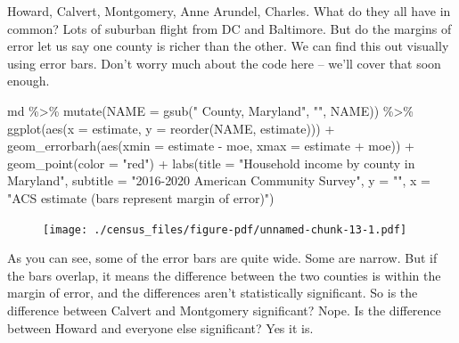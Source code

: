\documentclass[
  letterpaper,
  DIV=11,
  numbers=noendperiod]{scrreprt}
\newenvironment{Shaded}{\begin{snugshade}}{\end{snugshade}}
\newcommand{\AttributeTok}[1]{\textcolor[rgb]{0.40,0.45,0.13}{#1}}
\newcommand{\FunctionTok}[1]{\textcolor[rgb]{0.28,0.35,0.67}{#1}}
\newcommand{\NormalTok}[1]{\textcolor[rgb]{0.00,0.23,0.31}{#1}}
\newcommand{\SpecialCharTok}[1]{\textcolor[rgb]{0.37,0.37,0.37}{#1}}
\newcommand{\StringTok}[1]{\textcolor[rgb]{0.13,0.47,0.30}{#1}}
\begin{document}
Howard, Calvert, Montgomery, Anne Arundel, Charles. What do they all
have in common? Lots of suburban flight from DC and Baltimore. But do
the margins of error let us say one county is richer than the other. We
can find this out visually using error bars. Don't worry much about the
code here -- we'll cover that soon enough.

\begin{Shaded}
\begin{Highlighting}[]
\NormalTok{md }\SpecialCharTok{\%\textgreater{}\%}
  \FunctionTok{mutate}\NormalTok{(}\AttributeTok{NAME =} \FunctionTok{gsub}\NormalTok{(}\StringTok{" County, Maryland"}\NormalTok{, }\StringTok{""}\NormalTok{, NAME)) }\SpecialCharTok{\%\textgreater{}\%}
  \FunctionTok{ggplot}\NormalTok{(}\FunctionTok{aes}\NormalTok{(}\AttributeTok{x =}\NormalTok{ estimate, }\AttributeTok{y =} \FunctionTok{reorder}\NormalTok{(NAME, estimate))) }\SpecialCharTok{+}
  \FunctionTok{geom\_errorbarh}\NormalTok{(}\FunctionTok{aes}\NormalTok{(}\AttributeTok{xmin =}\NormalTok{ estimate }\SpecialCharTok{{-}}\NormalTok{ moe, }\AttributeTok{xmax =}\NormalTok{ estimate }\SpecialCharTok{+}\NormalTok{ moe)) }\SpecialCharTok{+}
  \FunctionTok{geom\_point}\NormalTok{(}\AttributeTok{color =} \StringTok{"red"}\NormalTok{) }\SpecialCharTok{+}
  \FunctionTok{labs}\NormalTok{(}\AttributeTok{title =} \StringTok{"Household income by county in Maryland"}\NormalTok{,}
       \AttributeTok{subtitle =} \StringTok{"2016{-}2020 American Community Survey"}\NormalTok{,}
       \AttributeTok{y =} \StringTok{""}\NormalTok{,}
       \AttributeTok{x =} \StringTok{"ACS estimate (bars represent margin of error)"}\NormalTok{)}
\end{Highlighting}
\end{Shaded}

\begin{figure}[H]

{\centering \texttt{[image: ./census\_files/figure-pdf/unnamed-chunk-13-1.pdf]}

}

\end{figure}

As you can see, some of the error bars are quite wide. Some are narrow.
But if the bars overlap, it means the difference between the two
counties is within the margin of error, and the differences aren't
statistically significant. So is the difference between Calvert and
Montgomery significant? Nope. Is the difference between Howard and
everyone else significant? Yes it is.
\end{document}
